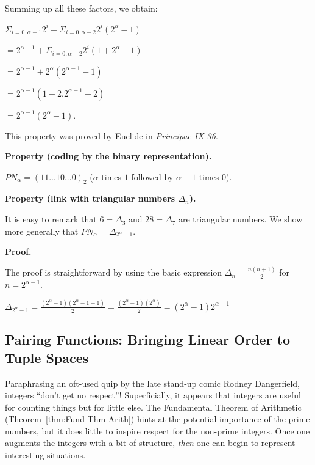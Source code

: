 Summing up all these factors, we obtain:

$\Sigma_{i=0,\alpha-1} 2^{i} + \Sigma_{i=0,\alpha-2} 2^{i}(2^\alpha-1)$

$= 2^{\alpha-1} + \Sigma_{i=0,\alpha-2} 2^{i}(1+2^\alpha-1)$

$ = 2^{\alpha-1} + 2^{\alpha} (2^{\alpha-1} -1) $

$ = 2^{\alpha-1} (1+2.2^{\alpha-1}-2) $

$= 2^{\alpha-1} (2^{\alpha}-1)$.

This property was proved by Euclide in \textit{Principae IX-36}.
\bigskip

%

\noindent
\textbf{Property (coding by the binary representation).}
\label{prop:codingPN}

$PN_\alpha = (11...10...0)_2$ ($\alpha$ times $1$ followed by $\alpha-1$ times $0$).

\medskip

\noindent
\textbf{Property (link with triangular numbers $\Delta_n$).}

\noindent 
It is easy to remark that $6=\Delta_3$ and $28=\Delta_7$ are triangular numbers.
We show more generally that $PN_\alpha = \Delta_{2^\alpha-1}$.
\medskip

\noindent 
\textbf{Proof.}

The proof is straightforward by using the basic expression $\Delta_{n} = \frac{n(n+1)}{2}$ for $n=2^{\alpha-1}$. 

$\Delta_{2^\alpha-1} = \frac{(2^\alpha-1)(2^\alpha-1+1)}{2} = \frac{(2^\alpha-1)(2^\alpha)}{2} = (2^\alpha-1)2^{\alpha-1}$



\subsection{Pairing Functions: Bringing Linear Order to Tuple Spaces}
\label{sec:pairing}

Paraphrasing an oft-used quip by the late stand-up comic Rodney
Dangerfield, integers ``don't get no respect''!  Superficially, it
appears that integers are useful for counting things but for little
else.  The Fundamental Theorem of Arithmetic
(Theorem~\ref{thm:Fund-Thm-Arith}) hints at the potential importance
of the prime numbers, but it does little to inspire respect for the
non-prime integers.  Once one augments the integers with a bit of
structure, {\em then} one can begin to represent interesting
situations.

